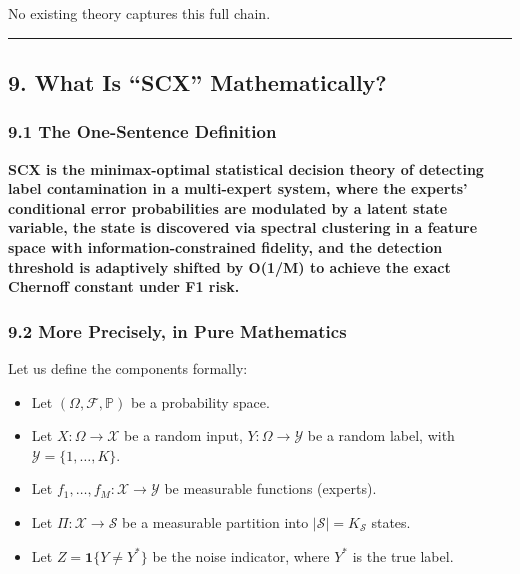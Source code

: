 \documentclass[
  12pt,
]{ctexart}
\providecommand{\tightlist}{%
  \setlength{\itemsep}{0pt}\setlength{\parskip}{0pt}}
\begin{document}
No existing theory captures this full chain.

\begin{center}\rule{0.5\linewidth}{0.5pt}\end{center}

\subsection{9. What Is ``SCX''
Mathematically?}\label{what-is-scx-mathematically}

\subsubsection{9.1 The One-Sentence
Definition}\label{the-one-sentence-definition}

\textbf{SCX is the minimax-optimal statistical decision theory of
detecting label contamination in a multi-expert system, where the
experts' conditional error probabilities are modulated by a latent state
variable, the state is discovered via spectral clustering in a feature
space with information-constrained fidelity, and the detection threshold
is adaptively shifted by O(1/M) to achieve the exact Chernoff constant
under F1 risk.}

\subsubsection{9.2 More Precisely, in Pure
Mathematics}\label{more-precisely-in-pure-mathematics}

Let us define the components formally:

\begin{itemize}
\tightlist
\item
  Let \((\Omega, \mathcal{F}, \mathbb{P})\) be a probability space.
\item
  Let \(X: \Omega \to \mathcal{X}\) be a random input,
  \(Y: \Omega \to \mathcal{Y}\) be a random label, with
  \(\mathcal{Y} = \{1, \dots, K\}\).
\item
  Let \(f_1, \dots, f_M: \mathcal{X} \to \mathcal{Y}\) be measurable
  functions (experts).
\item
  Let \(\Pi: \mathcal{X} \to \mathcal{S}\) be a measurable partition
  into \(|\mathcal{S}| = K_{\mathcal{S}}\) states.
\item
  Let \(Z = \mathbf{1}\{Y \neq Y^*\}\) be the noise indicator, where
  \(Y^*\) is the true label.
\end{itemize}
\end{document}
